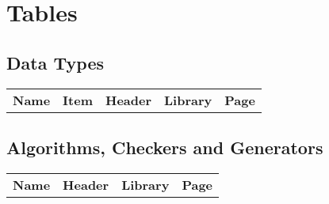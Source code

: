 \chapter{Tables} \label{Tables}

\section{Data Types} \label{Overview of Data Types}

\begin{longtable}[l]{lllll}
{\bf Name} &{\bf Item} &{\bf Header} &{\bf Library} &{\bf Page}\\

\end{longtable}

\section{Algorithms, Checkers and Generators}\label{Overview of Algorithms and Checkers}

\begin{longtable}[l]{llll}

{\bf Name} &{\bf Header} &{\bf Library} &{\bf Page}\\

\end{longtable}

